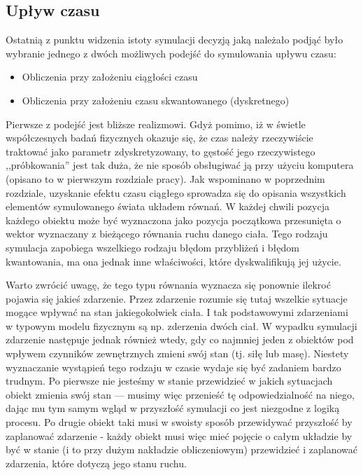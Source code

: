 {\subsection{Upływ czasu}
\par{
Ostatnią z punktu widzenia istoty symulacji decyzją jaką należało podjąć było wybranie jednego z dwóch możliwych podejść do symulowania upływu czasu:

\begin{itemize}
\item Obliczenia przy założeniu ciągłości czasu
\item Obliczenia przy założeniu czasu skwantowanego (dyskretnego)
\end{itemize}
}
\par{
Pierwsze z podejść jest bliższe realizmowi. Gdyż pomimo, iż w świetle współczesnych badań fizycznych okazuje się, że czas należy rzeczywiście traktować jako parametr zdyskretyzowany, to gęstość jego rzeczywistego ,,próbkowania'' jest tak duża, że nie sposób obsługiwać ją przy użyciu komputera (opisano to w pierwszym rozdziale pracy).
Jak wspominano w poprzednim rozdziale, uzyskanie efektu czasu ciągłego sprowadza się do opisania wszystkich elementów symulowanego świata układem równań. W każdej chwili pozycja każdego obiektu może być wyznaczona jako pozycja początkowa przesunięta o wektor wyznaczany z bieżącego równania ruchu danego ciała. Tego rodzaju symulacja zapobiega wszelkiego rodzaju błędom przybliżeń i błędom kwantowania, ma ona jednak inne właściwości, które dyskwalifikują jej użycie.
}
\par{
Warto zwrócić uwagę, że tego typu równania wyznacza się ponownie ilekroć pojawia się jakieś zdarzenie. Przez zdarzenie rozumie się tutaj wszelkie sytuacje mogące wpływać na stan jakiegokolwiek ciała. I tak podstawowymi zdarzeniami w typowym modelu fizycznym są np. zderzenia dwóch ciał. W wypadku symulacji zdarzenie następuje jednak również wtedy, gdy co najmniej jeden z obiektów pod wpływem czynników zewnętrznych zmieni swój stan (tj. siłę lub masę). Niestety wyznaczanie wystąpień tego rodzaju w czasie wydaje się być zadaniem bardzo trudnym. Po pierwsze nie jesteśmy w stanie przewidzieć w jakich sytuacjach obiekt zmienia swój stan --- musimy więc przenieść tę odpowiedzialność na niego, dając mu tym samym wgląd w przyszłość symulacji co jest niezgodne z logiką procesu. Po drugie obiekt taki musi w swoisty sposób przewidywać przyszłość by zaplanować zdarzenie - każdy obiekt musi więc mieć pojęcie o całym układzie by być w stanie (i to przy dużym nakładzie obliczeniowym) przewidzieć i zaplanować zdarzenia, które dotyczą jego stanu ruchu.
}}
